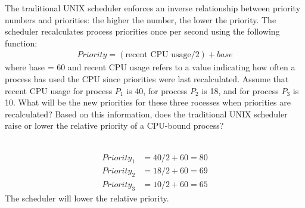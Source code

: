 \begin{exercise}[]{The traditional UNIX scheduler enforces an inverse relationship between priority numbers and priorities: the higher the number, the lower the priority. The scheduler recalculates process priorities once per second using the following function:   
    \begin{equation} \label{apart}
        \begin{split}
        Priority = (\text{recent CPU usage} / 2) + base
        \end{split}
    \end{equation}
    where base = 60 and recent CPU usage refers to a value indicating how often a process has used the CPU since priorities were last recalculated. 
    Assume that recent CPU usage for process $P_1$ is 40, for process $P_2$ is 18, and for process $P_3$ is 10. What will be the new priorities for these three rocesses when priorities are recalculated? Based on this information, does the traditional UNIX scheduler raise or lower the relative priority of a CPU-bound process?}
  \begin{solution}
  \par{~}
  \begin{equation}
      \begin{aligned}
          Priority_1 &= 40/2+60 = 80\\
          Priority_2 &= 18/2+60 = 69\\
          Priority_3 &= 10/2+60 = 65
      \end{aligned}
  \end{equation}
  The scheduler will lower the relative priority.
  \end{solution}
  \label{ex3}
\end{exercise}
